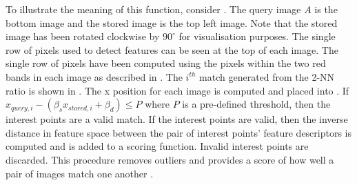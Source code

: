 \documentclass[11pt]{report}
\begin{document}
To illustrate the meaning of this function, consider . The query image $A$ is the bottom image and the stored image is the top left image. Note that the stored image has been rotated clockwise by $90^{\circ}$ for visualisation purposes. The single row of pixels used to detect features can be seen at the top of each image. The single row of pixels have been computed using the pixels within the two red bands in each image as described in . The $i^{th}$ match generated from the 2-NN ratio is shown in . The x position for each image is computed and placed into . If $x_{query,i} - (\beta_s x_{stored,i} + \beta_d) \leq P$ where $P$ is a pre-defined threshold, then the interest points are a valid match. If the interest points are valid, then the inverse distance in feature space between the pair of interest points' feature descriptors is computed and is added to a scoring function. Invalid interest points are discarded. This procedure removes outliers and provides a score of how well a pair of images match one another \cite{Anderson}.\\
\end{document}

